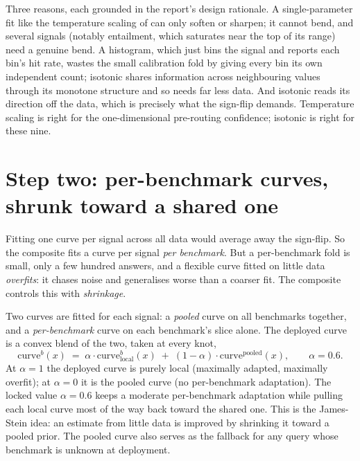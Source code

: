 \begin{pitfall}
Three reasons, each grounded in the report's design rationale. A single-parameter
fit like the temperature scaling of  can only soften or sharpen; it
cannot bend, and several signals (notably entailment, which saturates near the top of
its range) need a genuine bend. A histogram, which just bins the signal and reports
each bin's hit rate, wastes the small calibration fold by giving every bin its own
independent count; isotonic shares information across neighbouring values through its
monotone structure and so needs far less data. And isotonic reads its direction off
the data, which is precisely what the sign-flip demands. Temperature scaling is right
for the one-dimensional pre-routing confidence; isotonic is right for these nine.
\end{pitfall}

\section{Step two: per-benchmark curves, shrunk toward a shared one}
\label{sec:composite-shrinkage}

Fitting one curve per signal across all data would average away the sign-flip. So the
composite fits a curve per signal \emph{per benchmark}. But a per-benchmark fold is
small, only a few hundred answers, and a flexible curve fitted on little data
\emph{overfits}: it chases noise and generalises worse than a coarser fit. The
composite controls this with \emph{shrinkage}.

\begin{precise}
Two curves are fitted for each signal: a \emph{pooled} curve on all benchmarks
together, and a \emph{per-benchmark} curve on each benchmark's slice alone. The
deployed curve is a convex blend of the two, taken at every knot,
\[
  \text{curve}^{b}(x) \;=\; \alpha \cdot \text{curve}^{b}_{\text{local}}(x)
  \;+\; (1-\alpha)\cdot \text{curve}^{\text{pooled}}(x),
  \qquad \alpha = 0.6.
\]
At $\alpha=1$ the deployed curve is purely local (maximally adapted, maximally
overfit); at $\alpha=0$ it is the pooled curve (no per-benchmark adaptation). The
locked value $\alpha=0.6$ keeps a moderate per-benchmark adaptation while pulling each
local curve most of the way back toward the shared one. This is the James-Stein idea:
an estimate from little data is improved by shrinking it toward a pooled prior. The
pooled curve also serves as the fallback for any query whose benchmark is unknown at
deployment.
\end{precise}

